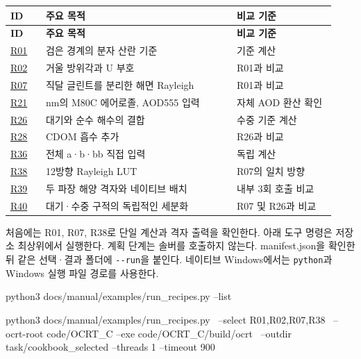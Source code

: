 {\TableFont
\begin{longtable}{@{}>{\raggedright\arraybackslash}p{0.10\linewidth}>{\raggedright\arraybackslash}p{0.54\linewidth}>{\raggedright\arraybackslash}p{0.29\linewidth}@{}}
\toprule
\textbf{ID} & \textbf{주요 목적} & \textbf{비교 기준} \\
\midrule
\endfirsthead
\toprule
\textbf{ID} & \textbf{주요 목적} & \textbf{비교 기준} \\
\midrule
\endhead
\bottomrule
\endfoot
\hyperref[recipe:R01]{R01} & 검은 경계의 분자 산란 기준 & 기준 계산 \\
\hyperref[recipe:R02]{R02} & 거울 방위각과 U 부호 & R01과 비교 \\
\hyperref[recipe:R07]{R07} & 직달 글린트를 분리한 해면 Rayleigh & R01과 비교 \\
\hyperref[recipe:R21]{R21} & 443 nm의 M80C 에어로졸, AOD555 입력 & 자체 AOD 환산 확인 \\
\hyperref[recipe:R26]{R26} & 대기와 순수 해수의 결합 & 수중 기준 계산 \\
\hyperref[recipe:R28]{R28} & CDOM 흡수 추가 & R26과 비교 \\
\hyperref[recipe:R36]{R36} & 전체 a·b·bb 직접 입력 & 독립 계산 \\
\hyperref[recipe:R38]{R38} & 12방향 Rayleigh LUT & R07의 일치 방향 \\
\hyperref[recipe:R39]{R39} & 두 파장 해양 격자와 네이티브 배치 & 내부 3회 호출 비교 \\
\hyperref[recipe:R40]{R40} & 대기·수중 구적의 독립적인 세분화 & R07 및 R26과 비교 \\
\end{longtable}
}

처음에는 R01, R07, R38로 단일 계산과 격자 출력을 확인한다. 아래 도구 명령은 저장소 최상위에서 실행한다. 계획 단계는 솔버를 호출하지 않는다. manifest.json을 확인한 뒤 같은 선택·결과 폴더에 \texttt{-\allowbreak{}-\allowbreak{}run}을 붙인다. 네이티브 Windows에서는 \texttt{python}과 Windows 실행 파일 경로를 사용한다.

\noindent\begin{minipage}{\linewidth}
\begin{ManualCode}

python3 docs/manual/examples/run_recipes.py --list

python3 docs/manual/examples/run_recipes.py \
  --select R01,R02,R07,R38 \
  --ocrt-root code/OCRT_C --exe code/OCRT_C/build/ocrt \
  --outdir task/cookbook_selected --threads 1 --timeout 900

\end{ManualCode}
\end{minipage}\par

